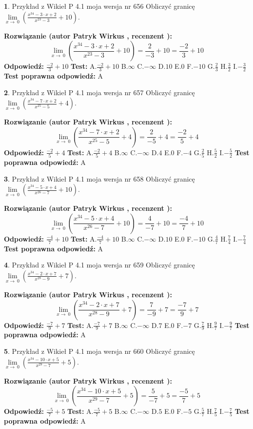 \documentclass[12pt, a4paper]{article}
\theoremstyle{definition} %
\newtheorem{zad}{}
\newcommand{\zadStart}[1]{\begin{zad}#1\newline}
\newcommand{\zadStop}{\end{zad}}
\newcommand{\rozwStart}[2]{\noindent \textbf{Rozwiązanie (autor #1 , recenzent #2): }\newline}
\newcommand{\rozwStop}{\newline}
\newcommand{\odpStart}{\noindent \textbf{Odpowiedź:}\newline}
\newcommand{\odpStop}{\newline}
\newcommand{\testStart}{\noindent \textbf{Test:}\newline}
\newcommand{\testStop}{\newline}
\newcommand{\kluczStart}{\noindent \textbf{Test poprawna odpowiedź:}\newline}
\newcommand{\kluczStop}{\newline}
\begin{document}
\zadStart{Przykład z Wikieł P 4.1 moja wersja nr 656}
Obliczyć granicę $\lim\limits_{x\to\ 0}(\frac{x^{34}-3 \cdot x +2}{x^{23}-3}+10)$.
\zadStop
\rozwStart{Patryk Wirkus}{}
$$\lim\limits_{x\to\ 0}(\frac{x^{34}-3 \cdot x +2}{x^{23}-3}+10)=\frac{2}{-3}+10=\frac{-2}{3}+10$$
\rozwStop
\odpStart
$\frac{-2}{3}+10$
\odpStop
\testStart
A.$\frac{-2}{3}+10$
B.$\infty$
C.$-\infty$
D.$10$
E.$0$
F.$-10$
G.$\frac{2}{3}$
H.$\frac{3}{2}$
I.$-\frac{3}{2}$
\testStop
\kluczStart
A
\kluczStop



\zadStart{Przykład z Wikieł P 4.1 moja wersja nr 657}
Obliczyć granicę $\lim\limits_{x\to\ 0}(\frac{x^{34}-7 \cdot x +2}{x^{25}-5}+4)$.
\zadStop
\rozwStart{Patryk Wirkus}{}
$$\lim\limits_{x\to\ 0}(\frac{x^{34}-7 \cdot x +2}{x^{25}-5}+4)=\frac{2}{-5}+4=\frac{-2}{5}+4$$
\rozwStop
\odpStart
$\frac{-2}{5}+4$
\odpStop
\testStart
A.$\frac{-2}{5}+4$
B.$\infty$
C.$-\infty$
D.$4$
E.$0$
F.$-4$
G.$\frac{2}{5}$
H.$\frac{5}{2}$
I.$-\frac{5}{2}$
\testStop
\kluczStart
A
\kluczStop



\zadStart{Przykład z Wikieł P 4.1 moja wersja nr 658}
Obliczyć granicę $\lim\limits_{x\to\ 0}(\frac{x^{34}-5 \cdot x +4}{x^{26}-7}+10)$.
\zadStop
\rozwStart{Patryk Wirkus}{}
$$\lim\limits_{x\to\ 0}(\frac{x^{34}-5 \cdot x +4}{x^{26}-7}+10)=\frac{4}{-7}+10=\frac{-4}{7}+10$$
\rozwStop
\odpStart
$\frac{-4}{7}+10$
\odpStop
\testStart
A.$\frac{-4}{7}+10$
B.$\infty$
C.$-\infty$
D.$10$
E.$0$
F.$-10$
G.$\frac{4}{7}$
H.$\frac{7}{4}$
I.$-\frac{7}{4}$
\testStop
\kluczStart
A
\kluczStop



\zadStart{Przykład z Wikieł P 4.1 moja wersja nr 659}
Obliczyć granicę $\lim\limits_{x\to\ 0}(\frac{x^{34}-2 \cdot x +7}{x^{28}-9}+7)$.
\zadStop
\rozwStart{Patryk Wirkus}{}
$$\lim\limits_{x\to\ 0}(\frac{x^{34}-2 \cdot x +7}{x^{28}-9}+7)=\frac{7}{-9}+7=\frac{-7}{9}+7$$
\rozwStop
\odpStart
$\frac{-7}{9}+7$
\odpStop
\testStart
A.$\frac{-7}{9}+7$
B.$\infty$
C.$-\infty$
D.$7$
E.$0$
F.$-7$
G.$\frac{7}{9}$
H.$\frac{9}{7}$
I.$-\frac{9}{7}$
\testStop
\kluczStart
A
\kluczStop



\zadStart{Przykład z Wikieł P 4.1 moja wersja nr 660}
Obliczyć granicę $\lim\limits_{x\to\ 0}(\frac{x^{34}-10 \cdot x +5}{x^{29}-7}+5)$.
\zadStop
\rozwStart{Patryk Wirkus}{}
$$\lim\limits_{x\to\ 0}(\frac{x^{34}-10 \cdot x +5}{x^{29}-7}+5)=\frac{5}{-7}+5=\frac{-5}{7}+5$$
\rozwStop
\odpStart
$\frac{-5}{7}+5$
\odpStop
\testStart
A.$\frac{-5}{7}+5$
B.$\infty$
C.$-\infty$
D.$5$
E.$0$
F.$-5$
G.$\frac{5}{7}$
H.$\frac{7}{5}$
I.$-\frac{7}{5}$
\testStop
\kluczStart
A
\kluczStop
\end{document}
